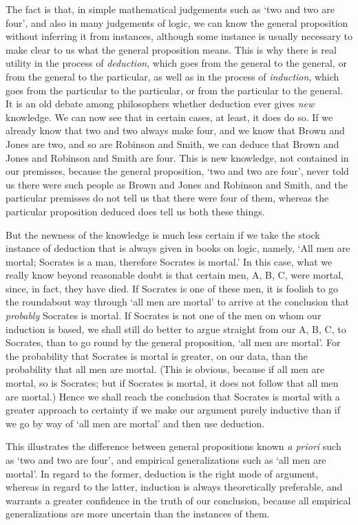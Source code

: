 \documentclass[oneside,letterpaper,12pt]{book}
\begin{document}
The fact is that, in simple mathematical judgements such as
`two and two are four', and also in many
judgements of logic, we can know the general proposition without
inferring it from instances, although some instance is usually necessary
to make clear to us what the general proposition means. This is why
there is real utility in the process of \emph{deduction}, which goes
from the general to the general, or from the general to the particular,
as well as in the process of \emph{induction}, which goes from the
particular to the particular, or from the particular to the general. It
is an old debate among philosophers whether deduction ever gives
\emph{new} knowledge. We can now see that in certain cases, at least, it
does do so. If we already know that two and two always make four, and we
know that Brown and Jones are two, and so are Robinson and Smith, we can
deduce that Brown and Jones and Robinson and Smith are four. This is new
knowledge, not contained in our premisses, because the general
proposition, `two and two are four',
never told us there were such people as Brown and Jones and Robinson and
Smith, and the particular premisses do not tell us that there were four
of them, whereas the particular proposition deduced does tell us both
these things.

But the newness of the knowledge is much less certain if we take the
stock instance of deduction that is always given in books on logic,
namely, `All men are mortal; Socrates is a man,
therefore Socrates is mortal.' In this case, what we
really know beyond reasonable doubt is that certain men, A, B, C, were
mortal, since, in fact, they have died. If Socrates is one of these men,
it is foolish to go the roundabout way through `all men
are mortal' to arrive at the conclusion that
\emph{probably} Socrates is mortal. If Socrates is not one of the men on
whom our induction is based, we shall still do better to argue straight
from our A, B, C, to Socrates, than to go round by the general
proposition, `all men are mortal'. For
the probability that Socrates is mortal is greater, on our data, than
the probability that all men are mortal. (This is obvious, because if
all men are mortal, so is Socrates; but if Socrates is mortal, it does
not follow that all men are mortal.) Hence we shall reach the conclusion
that Socrates is mortal with a greater approach to certainty if we make
our argument purely inductive than if we go by way of
`all men are mortal' and then use
deduction.

This illustrates the difference between general propositions known
\emph{a priori} such as `two and two are
four', and empirical generalizations such as
`all men are mortal'. In regard to the
former, deduction is the right mode of argument, whereas in regard to
the latter, induction is always theoretically preferable, and warrants a
greater confidence in the truth of our conclusion, because all empirical
generalizations are more uncertain than the instances of them.
\end{document}
